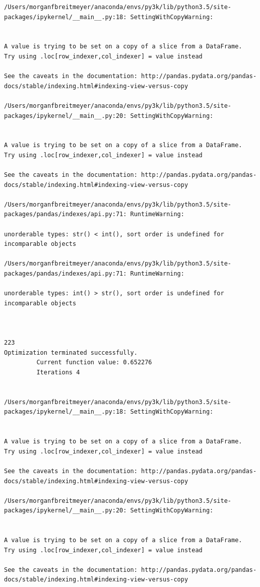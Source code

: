 \begin{lstlisting}
/Users/morganfbreitmeyer/anaconda/envs/py3k/lib/python3.5/site-packages/ipykernel/__main__.py:18: SettingWithCopyWarning:


A value is trying to be set on a copy of a slice from a DataFrame.
Try using .loc[row_indexer,col_indexer] = value instead

See the caveats in the documentation: http://pandas.pydata.org/pandas-docs/stable/indexing.html#indexing-view-versus-copy

/Users/morganfbreitmeyer/anaconda/envs/py3k/lib/python3.5/site-packages/ipykernel/__main__.py:20: SettingWithCopyWarning:


A value is trying to be set on a copy of a slice from a DataFrame.
Try using .loc[row_indexer,col_indexer] = value instead

See the caveats in the documentation: http://pandas.pydata.org/pandas-docs/stable/indexing.html#indexing-view-versus-copy

/Users/morganfbreitmeyer/anaconda/envs/py3k/lib/python3.5/site-packages/pandas/indexes/api.py:71: RuntimeWarning:

unorderable types: str() < int(), sort order is undefined for incomparable objects

/Users/morganfbreitmeyer/anaconda/envs/py3k/lib/python3.5/site-packages/pandas/indexes/api.py:71: RuntimeWarning:

unorderable types: int() > str(), sort order is undefined for incomparable objects



223
Optimization terminated successfully.
         Current function value: 0.652276
         Iterations 4


/Users/morganfbreitmeyer/anaconda/envs/py3k/lib/python3.5/site-packages/ipykernel/__main__.py:18: SettingWithCopyWarning:


A value is trying to be set on a copy of a slice from a DataFrame.
Try using .loc[row_indexer,col_indexer] = value instead

See the caveats in the documentation: http://pandas.pydata.org/pandas-docs/stable/indexing.html#indexing-view-versus-copy

/Users/morganfbreitmeyer/anaconda/envs/py3k/lib/python3.5/site-packages/ipykernel/__main__.py:20: SettingWithCopyWarning:


A value is trying to be set on a copy of a slice from a DataFrame.
Try using .loc[row_indexer,col_indexer] = value instead

See the caveats in the documentation: http://pandas.pydata.org/pandas-docs/stable/indexing.html#indexing-view-versus-copy


\end{lstlisting}
